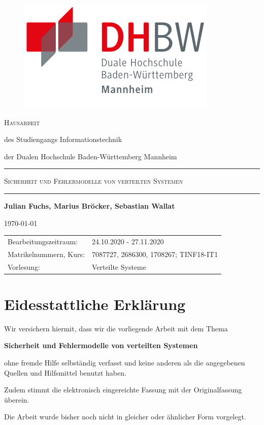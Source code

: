\documentclass[12pt,a4paper,parskip=half]{scrreprt}
\begin{document}
	
	\begin{titlepage}
		
		\centering
				
		\begin{figure}
			\raggedright
			\includegraphics[width = .25\textwidth, right]{dhbw-logo}
		\end{figure}
		
		\bigskip
		
		\Large\textsc{Hausarbeit}
		
		\normalsize
		
		des Studiengangs Informationstechnik \par
		der Dualen Hochschule Baden-Württemberg Mannheim
		
		\rule{\textwidth}{.5mm}\bigskip
		
		\textsc{\large Sicherheit und Fehlermodelle von verteilten Systemen}	
		
		\rule{\textwidth}{.5mm}
		
		\vfill
		
		\par
		
		{\bfseries\large Julian Fuchs, Marius Bröcker, Sebastian Wallat} \par
		\today
		
		\vfill
		
		\small{%
			\begin{tabularx}{\textwidth}{@{}lX@{}}
				\toprule
				Bearbeitungszeitraum: & 24.10.2020 - 27.11.2020 \\
				Matrikelnummern, Kurs: & 7087727, 2686300, 1708267; TINF18-IT1 \\
				Vorlesung: & Verteilte Systeme \\
			\end{tabularx}
		}
		
		\cleardoublepage
		
	\end{titlepage}
	
	\newpage
	
	\chapter*{Eidesstattliche Erklärung}

		\vspace{50pt}
		Wir versichern hiermit, dass wir die vorliegende Arbeit mit dem Thema \par
		\quad\textbf{\glqq{}Sicherheit und Fehlermodelle von verteilten Systemen\grqq{}} \par
		ohne fremde Hilfe selbständig verfasst und keine anderen als die angegebenen Quellen und Hilfsmittel benutzt haben. \par
		Zudem stimmt die elektronisch eingereichte Fassung mit der Originalfassung überein. \par
		Die Arbeit wurde bisher noch nicht in gleicher oder ähnlicher Form vorgelegt.
		
\end{document}
